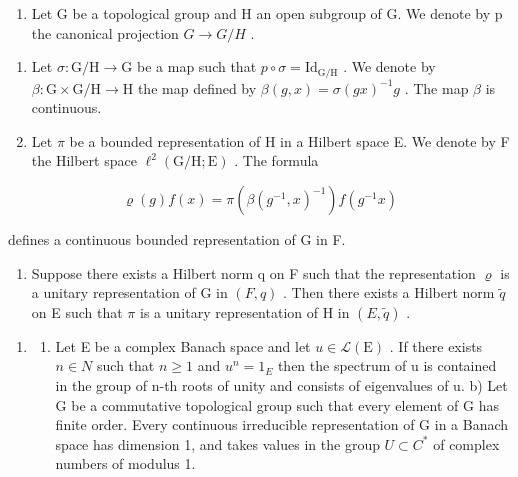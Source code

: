 \begin{enumerate}
\def\labelenumi{\arabic{enumi})}
\setcounter{enumi}{4}
\tightlist
\item
  Let G be a topological group and H an open subgroup of G. We denote by p the canonical projection \(G \rightarrow G/H\) .
\end{enumerate}

\begin{enumerate}
\def\labelenumi{\alph{enumi})}
\item
  Let \(\sigma\colon\mathrm{G/H}\to\mathrm{G}\) be a map such that \(p\circ\sigma=\mathrm{Id}_{\mathrm{G/H}}\) . We denote by \(\beta\colon\mathrm{G}\times\mathrm{G/H}\to\mathrm{H}\) the map defined by \(\beta(g,x)=\sigma(gx)^{-1}g\) . The map \(\beta\) is continuous.
\item
  Let \(\pi\) be a bounded representation of H in a Hilbert space E. We denote by F the Hilbert space \(\ell^2 (\mathrm{G / H};\mathrm{E})\) . The formula
\end{enumerate}

\[
\varrho (g) f (x) = \pi (\beta (g ^ {- 1}, x) ^ {- 1}) f (g ^ {- 1} x)
\]

defines a continuous bounded representation of G in F.

\begin{enumerate}
\def\labelenumi{\alph{enumi})}
\setcounter{enumi}{2}
\tightlist
\item
  Suppose there exists a Hilbert norm q on F such that the representation \(\varrho\) is a unitary representation of G in \((F,q)\) . Then there exists a Hilbert norm \(\widetilde{q}\) on E such that \(\pi\) is a unitary representation of H in \((E,\widetilde{q})\) .
\end{enumerate}

\begin{enumerate}
\def\labelenumi{\arabic{enumi})}
\setcounter{enumi}{5}
\tightlist
\item
  \begin{enumerate}
  \def\labelenumii{\alph{enumii})}
  \tightlist
  \item
    Let E be a complex Banach space and let \(u \in \mathcal{L}(\mathrm{E})\) . If there exists \(n \in N\) such that \(n \geqslant 1\) and \(u^{n} = 1_{E}\) then the spectrum of u is contained in the group of n-th roots of unity and consists of eigenvalues of u. b) Let G be a commutative topological group such that every element of G has finite order. Every continuous irreducible representation of G in a Banach space has dimension 1, and takes values in the group \(U \subset C^{*}\) of complex numbers of modulus 1.
  \end{enumerate}
\end{enumerate}

